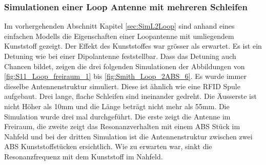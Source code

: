 \subsubsection{Simulationen einer Loop Antenne mit mehreren Schleifen}
Im vorhergehenden Abschnitt Kapitel \ref{sec:SimL2Loop} sind anhand eines einfachen Modells die Eigenschaften einer Loopantenne mit umliegendem Kunststoff gezeigt. Der Effekt des Kunststoffes war grösser als erwartet. Es ist ein Detuning wie bei einer Dipolantenne feststellbar. Dass das Detuning auch Chancen bildet, zeigen die drei folgenden Simulationen der Abbildungen von \ref{fig:S11_Loop_freiraum_1} bis \ref{fig:Smith_Loop_2ABS_6}. Es wurde immer dieselbe Antennenstruktur simuliert. Diese ist ähnlich wie eine RFID Spule aufgebaut. Drei lange, flache Schleifen sind ineinander gedreht. Die Äusserste ist nicht Höher als 10mm und die Länge beträgt nicht mehr als 55mm. Die Simulation wurde drei mal durchgeführt. Die erste zeigt die Antenne im Freiraum, die zweite zeigt das Resonanzverhalten mit einem ABS Stück im Nahfeld und bei der dritten Simulation ist die Antennenstruktur zwischen zwei ABS Kunststoffstücken ersichtlich. Wie zu erwarten war, sinkt die Resonanzfrequenz mit dem Kunststoff im Nahfeld. 
